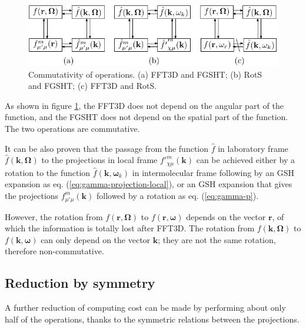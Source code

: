 \begin{figure}[h]
\begin{centering}
\includegraphics{_figure/algorithms_commutativity}
\par\end{centering}
\caption[Commutativity of operations]{Commutativity of operations. (a) FFT3D and FGSHT; (b) RotS and FGSHT;
(c) FFT3D and RotS.\label{fig:Commutativity-of-operations}}
\end{figure}

As shown in figure \ref{fig:Commutativity-of-operations}, the \acs{FFT}3D
does not depend on the angular part of the function, and the \acs{FGSHT}
does not depend on the spatial part of the function. The two operations
are commutative. 

It can be also proven that the passage from the function $\hat{f}$
in laboratory frame $\hat{f}(\mathbf{k},\mathbf{\Omega})$ to the
projections in local frame ${f'}_{\chi\mu}^{m}(\mathbf{k})$ can be
achieved either by a rotation to the function $\hat{f}(\mathbf{k},\boldsymbol{\omega}_{k})$
in intermolecular frame following by an \acs{GSH} expansion as eq.
(\ref{eq:gamma-projection-local}), or an \acs{GSH} expansion that
gives the projections $f_{\mu'\mu}^{m}(\mathbf{k})$ followed by
a rotation as eq. (\ref{eq:gamma-p}).

However, the rotation from $f(\mathbf{r},\mathbf{\Omega})$ to $f(\mathbf{r},\boldsymbol{\omega})$
depends on the vector $\mathbf{r}$, of which the information is totally
lost after \acs{FFT}3D. The rotation from $f(\mathbf{k},\mathbf{\Omega})$
to $f(\mathbf{k},\boldsymbol{\omega})$ can only depend on the vector
$\mathbf{k}$; they are not the same rotation, therefore non-commutative. 

\subsection{Reduction by symmetry\label{subsec:Reduction-by-symmetry}}

A further reduction of computing cost can be made by performing about
only half of the operations, thanks to the symmetric relations between
the projections.

